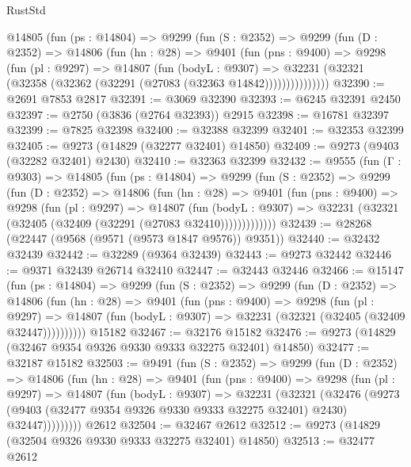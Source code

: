 \begin{lexlean}{RustStd}
\begin{coremodule}
      @14805
        (fun (ps : @14804) =>
        @9299
          (fun (S : @2352) =>
          @9299
            (fun (D : @2352) =>
            @14806
              (fun (hn : @28) =>
              @9401
                (fun (pns : @9400) =>
                @9298
                  (fun (pl : @9297) =>
                  @14807
                    (fun (bodyL : @9307) =>
                    @32231 (@32321 (@32358 (@32362 (@32291 (@27083 (@32363 @14842)))))))))))))))
@32390 := @2691 @7853 @2817
@32391 := @3069 @32390
@32393 := @6245 @32391 @2450
@32397 := @2750 (@3836 (@2764 @32393)) @2915
@32398 := @16781 @32397
@32399 := @7825 @32398
@32400 := @32388 @32399
@32401 := @32353 @32399
@32405 := @9273 (@14829 (@32277 @32401) @14850)
@32409 := @9273 (@9403 (@32282 @32401) @2430)
@32410 := @32363 @32399
@32432 := @9555
    (fun (Γ : @9303) =>
    @14805
      (fun (ps : @14804) =>
      @9299
        (fun (S : @2352) =>
        @9299
          (fun (D : @2352) =>
          @14806
            (fun (hn : @28) =>
            @9401
              (fun (pns : @9400) =>
              @9298
                (fun (pl : @9297) =>
                @14807
                  (fun (bodyL : @9307) =>
                  @32231 (@32321 (@32405 (@32409 (@32291 (@27083 @32410)))))))))))))
@32439 := @28268 (@22447 (@9568 (@9571 (@9573 @1847 @9576)) @9351))
@32440 := @32432 @32439
@32442 := @32289 (@9364 @32439)
@32443 := @9273 @32442
@32446 := @9371 @32439 @26714 @32410
@32447 := @32443 @32446
@32466 := @15147
    (fun (ps : @14804) =>
    @9299
      (fun (S : @2352) =>
      @9299
        (fun (D : @2352) =>
        @14806
          (fun (hn : @28) =>
          @9401
            (fun (pns : @9400) =>
            @9298
              (fun (pl : @9297) =>
              @14807 (fun (bodyL : @9307) => @32231 (@32321 (@32405 (@32409 @32447))))))))))
    @15182
@32467 := @32176 @15182
@32476 := @9273 (@14829 (@32467 @9354 @9326 @9330 @9333 @32275 @32401) @14850)
@32477 := @32187 @15182
@32503 := @9491
    (fun (S : @2352) =>
    @9299
      (fun (D : @2352) =>
      @14806
        (fun (hn : @28) =>
        @9401
          (fun (pns : @9400) =>
          @9298
            (fun (pl : @9297) =>
            @14807
              (fun (bodyL : @9307) =>
              @32231
                (@32321
                  (@32476
                    (@9273
                      (@9403 (@32477 @9354 @9326 @9330 @9333 @32275 @32401) @2430)
                      @32447)))))))))
    @2612
@32504 := @32467 @2612
@32512 := @9273 (@14829 (@32504 @9326 @9330 @9333 @32275 @32401) @14850)
@32513 := @32477 @2612

\end{coremodule}
\end{lexlean}
